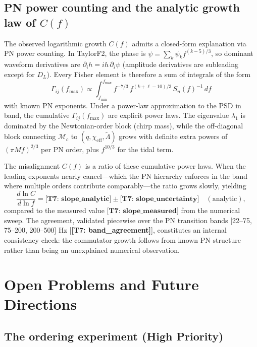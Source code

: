 \documentclass[twocolumn,prd,showpacs,superscriptaddress]{revtex4-2}
\newcommand{\Mchirp}{\mathcal{M}_c}
\newcommand{\Lambdatilde}{\tilde{\Lambda}}
\newcommand{\chieff}{\chi_{\text{eff}}}
\newcommand{\fmin}{f_{\text{min}}}
\newcommand{\manifest}[1]{\textbf{[#1]}}
\begin{document}
\subsection{PN power counting and the analytic growth law of $C(f)$}

The observed logarithmic growth $C(f)$ admits a closed-form explanation via PN power counting. In TaylorF2, the phase is $\psi = \sum_k \psi_k f^{(k-5)/3}$, so dominant waveform derivatives are $\partial_i h = i h\,\partial_i\psi$ (amplitude derivatives are subleading except for $D_L$). Every Fisher element is therefore a sum of integrals of the form
\begin{equation}
\Gamma_{ij}(f_{\max}) \propto \int_{\fmin}^{f_{\max}} f^{-7/3}\, f^{(k+\ell-10)/3}\, S_n(f)^{-1}\,df
\end{equation}
with known PN exponents. Under a power-law approximation to the PSD in band, the cumulative $\Gamma_{ij}(f_{\max})$ are explicit power laws. The eigenvalue $\lambda_1$ is dominated by the Newtonian-order block (chirp mass), while the off-diagonal block connecting $\Mchirp$ to $(q, \chieff, \Lambdatilde)$ grows with definite extra powers of $(\pi M f)^{2/3}$ per PN order, plus $f^{10/3}$ for the tidal term.

The misalignment $C(f)$ is a ratio of these cumulative power laws. When the leading exponents nearly cancel---which the PN hierarchy enforces in the band where multiple orders contribute comparably---the ratio grows slowly, yielding
\begin{equation}
\frac{d\ln C}{d\ln f} = \manifest{T7: slope_analytic} \pm \manifest{T7: slope_uncertainty} \quad (\text{analytic}),
\end{equation}
compared to the measured value $\manifest{T7: slope_measured}$ from the numerical sweep. The agreement, validated piecewise over the PN transition bands [22--75, 75--200, 200--500] Hz [\manifest{T7: band_agreement}], constitutes an internal consistency check: the commutator growth follows from known PN structure rather than being an unexplained numerical observation.

\section{Open Problems and Future Directions}
\label{sec:open}

\subsection{The ordering experiment (High Priority)}
\label{sec:ordering}
\end{document}
